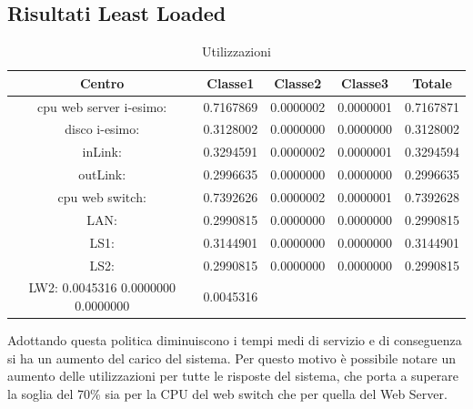 \subsection{Risultati Least Loaded}
\begin{table}[htbp]
\begin{center}
\begin{tabular}{|c|c|c|c|c|}
\hline
Centro &Classe1 &Classe2 &Classe3 &Totale\\
\hline
\hline
 cpu web server i-esimo: 	&0.7167869	&0.0000002	&0.0000001	&0.7167871\\
\hline
 disco i-esimo: 	&0.3128002	&0.0000000	&0.0000000	&0.3128002\\
\hline
 inLink: 	&0.3294591	&0.0000002	&0.0000001	&0.3294594\\
\hline
 outLink: 	&0.2996635	&0.0000000	&0.0000000	&0.2996635\\
\hline
 cpu web switch: 	&0.7392626	&0.0000002	&0.0000001	&0.7392628\\
\hline
 LAN: 	&0.2990815	&0.0000000	&0.0000000	&0.2990815\\
\hline
 LS1: 	&0.3144901	&0.0000000	&0.0000000	&0.3144901\\
\hline
 LS2:	&0.2990815	&0.0000000	&0.0000000	&0.2990815\\
\hline
 LW2: 	0.0045316	0.0000000	0.0000000	&0.0045316\\
\hline
\end{tabular}
\end{center}
\caption{Utilizzazioni}
\label{utilizzazioni}
\end{table}
Adottando questa politica diminuiscono i tempi medi di servizio e di conseguenza si ha un aumento del carico del sistema. Per questo motivo è possibile notare un aumento delle utilizzazioni per tutte le risposte del sistema, che porta a superare la soglia del 70\% sia per la CPU del web switch che per quella del Web Server.
